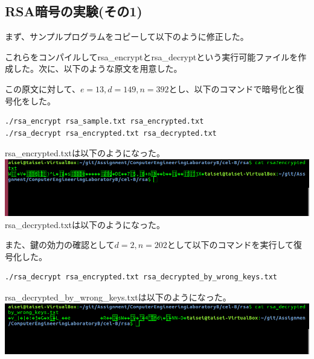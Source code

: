 \documentclass[a4j]{celb-report}
\begin{document}
\subsection{RSA暗号の実験(その1)}
まず、サンプルプログラムをコピーして以下のように修正した。


これらをコンパイルしてrsa\_encryptとrsa\_decryptという実行可能ファイルを作成した。次に、以下のような原文を用意した。

この原文に対して、$ e = 13, d = 149, n = 392 $とし、以下のコマンドで暗号化と復号化をした。
\begin{lstlisting}[basicstyle=\ttfamily\footnotesize, frame=single]
./rsa_encrypt rsa_sample.txt rsa_encrypted.txt
./rsa_decrypt rsa_encrypted.txt rsa_decrypted.txt
\end{lstlisting}
rsa\_encrypted.txtは以下のようになった。\\
\includegraphics[width=15cm]{../rsa/rsa_encrypted.png}\\
rsa\_decrypted.txtは以下のようになった。

また、鍵の効力の確認として$ d = 2, n = 202 $として以下のコマンドを実行して復号化した。
\begin{lstlisting}[basicstyle=\ttfamily\footnotesize, frame=single]
./rsa_decrypt rsa_encrypted.txt rsa_decrypted_by_wrong_keys.txt
\end{lstlisting}
rsa\_decrypted\_by\_wrong\_keys.txtは以下のようになった。\\
\includegraphics[width=15cm]{../rsa/rsa_decrypted_by_wrong_keys.png}\\
\end{document}
